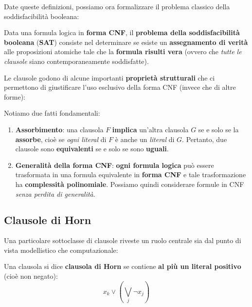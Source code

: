 Date queste definizioni, possiamo ora formalizzare il problema classico della soddisfacibilità booleana:

\begin{definition}
    Data una formula logica in \textbf{forma CNF}, il \textbf{problema della 
    soddisfacibilità booleana} (\textbf{SAT}) consiste nel determinare se esiste 
    un \textbf{assegnamento di verità} alle proposizioni atomiche tale che la 
    \textbf{formula risulti vera} (ovvero che \textit{tutte le clausole} siano 
    contemporaneamente soddisfatte).
\end{definition}

Le clausole godono di alcune importanti \textbf{proprietà strutturali} che ci permettono di
giustificare l'uso esclusivo della forma CNF (invece che di altre forme):

\begin{remark}
    Notiamo due fatti fondamentali:
    \begin{enumerate}
        \item \textbf{Assorbimento}: una clausola $F$ \textbf{implica} un'altra clausola $G$ 
            se e solo se la \textbf{assorbe}, cioè se \textit{ogni literal} di $F$ è anche 
            un \textit{literal} di $G$. Pertanto, due clausole sono \textbf{equivalenti} 
            se e solo se sono \textbf{uguali}.
        \item \textbf{Generalità della forma CNF}: \textbf{ogni formula logica} può 
            essere trasformata in una formula equivalente in \textbf{forma CNF} e tale 
            trasformazione ha \textbf{complessità polinomiale}. Possiamo quindi considerare 
            formule in CNF \textit{senza perdita di generalità}.
    \end{enumerate}
\end{remark}

\subsection{Clausole di Horn}

Una particolare sottoclasse di clausole riveste un ruolo centrale sia dal punto di vista 
modellistico che computazionale:

\begin{definition}
    Una clausola si dice \textbf{clausola di Horn} se contiene \textbf{al più un literal 
    positivo} (cioè non negato):
    \[
        x_k \lor \left(\bigvee_j \neg x_j\right)
    \]
\end{definition}

